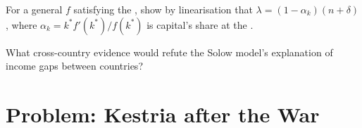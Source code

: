 \begin{exercise}[$\star\star\star$]\label{exo:b1:solow-model:linear}
For a general $f$ satisfying the , show by linearisation
that $\lambda = (1 - \alpha_k)(n + \delta)$, where $\alpha_k = k^*f'(k^*)/f(k^*)$ is capital's share at the
.
\end{exercise}

\begin{exercise}[$\star\star\star$]\label{exo:b1:solow-model:refute}
What cross-country evidence would refute the Solow model's explanation of
income gaps between countries?
\end{exercise}

\section{Problem: Kestria after the War}\label{sec:b1:solow-model:problem}

